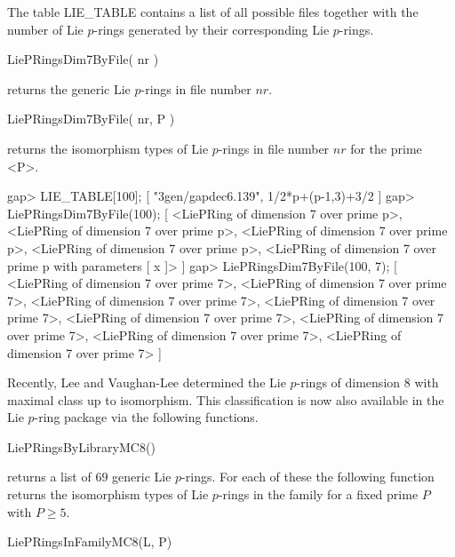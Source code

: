 The table LIE_TABLE contains a list of all possible files together with
the number of Lie $p$-rings generated by their corresponding Lie $p$-rings. 

\> LiePRingsDim7ByFile( nr )

returns the generic Lie $p$-rings in file number $nr$.

\> LiePRingsDim7ByFile( nr, P )

returns the isomorphism types of Lie $p$-rings in file number $nr$ for
the prime <P>.

\beginexample
gap> LIE_TABLE[100];
[ "3gen/gapdec6.139", 1/2*p+(p-1,3)+3/2 ]
gap> LiePRingsDim7ByFile(100);
[ <LiePRing of dimension 7 over prime p>, 
  <LiePRing of dimension 7 over prime p>, 
  <LiePRing of dimension 7 over prime p>,
  <LiePRing of dimension 7 over prime p>,
  <LiePRing of dimension 7 over prime p with parameters [ x ]> ]
gap> LiePRingsDim7ByFile(100, 7);
[ <LiePRing of dimension 7 over prime 7>, 
  <LiePRing of dimension 7 over prime 7>, 
  <LiePRing of dimension 7 over prime 7>, 
  <LiePRing of dimension 7 over prime 7>, 
  <LiePRing of dimension 7 over prime 7>, 
  <LiePRing of dimension 7 over prime 7>, 
  <LiePRing of dimension 7 over prime 7>, 
  <LiePRing of dimension 7 over prime 7> ]
\endexample


Recently, Lee and Vaughan-Lee \cite{MC8} determined the Lie $p$-rings 
of dimension 8 with maximal class up to isomorphism. This classification
is now also available in the Lie $p$-ring package via the following functions.

\> LiePRingsByLibraryMC8()

returns a list of $69$ generic Lie $p$-rings. For each of these
the following function returns the isomorphism types of Lie $p$-rings 
in the family for a fixed prime $P$ with $P \geq 5$.

\> LiePRingsInFamilyMC8(L, P)

